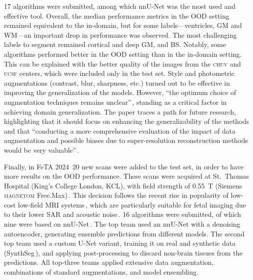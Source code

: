 \num{17} algorithms were submitted, among which nnU-Net was the most used and effective tool. Overall, the median performance metrics in the OOD setting remained equivalent to the in-domain, but for some labels---ventricles, GM and  WM---an important drop in performance was observed. The most challenging labels to segment remained cortical and deep GM, and BS. Notably, some algorithms performed better in the OOD setting than in the in-domain setting. This can be explained with the better quality of the images from the \textsc{chuv} and \textsc{ucsf} centers, which were included only in the test set. Style and photometric augmentations (contrast, blur, sharpness, etc.) turned out to be effective in improving the generalization of the models. However, \enquote{the optimum choice of augmentation techniques remains unclear}\,\cite{FeTA2022_review}, standing as a critical factor in achieving domain generalization. The paper traces a path for future research, highlighting that it should focus on enhancing the generalizability of the methods and that \enquote{conducting a more comprehensive evaluation of the impact of data augmentation and possible biases due to super-resolution reconstruction methods would be very valuable}\,\cite{FeTA2022_review}.

Finally, in FeTA 2024\,\cite{FeTA2024_review, FeTA2024} \num{20} new scans were added to the test set, in order to have more results on the OOD performance. These scans were acquired at St.\ Thomas Hospital (King's College London, KCL), with field strength of \qty{0.55}{\tesla} (Siemens \textsc{magnetom} Free.Max)\,\cite{FeTA2024_paper}. This decision follows the recent rise in popularity of low-cost low-field MRI systems\,\cite{Aviles2023}, which are particularly suitable for fetal imaging due to their lower SAR and acoustic noise\,\cite{Ponrartana2023}. \num{16} algorithms were submitted, of which nine were based on nnU-Net\,\cite{nnUNet, Isensee2021}. The top team used an nnU-Net with a denoising autoencoder, generating ensemble predictions from different models. The second top team used a custom U-Net variant, training it on real and synthetic data (SynthSeg\,\cite{Billot2023}), and applying post-processing to discard non-brain tissues from the predictions. All top-three teams applied extensive data augmentation, combinations of standard augmentations, and model ensembling.

